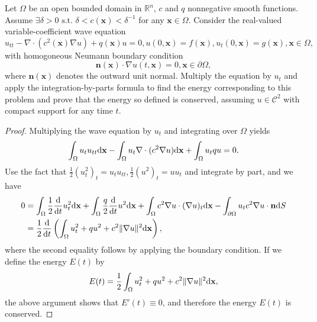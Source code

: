 \begin{pro}
  Let $\Omega$ be an open bounded domain in $\mathbb{R}^n$,
  $c$ and $q$ nonnegative smooth functions.
  Assume
  $\exists\delta>0 \text{ s.t. }\delta<c(\mathbf{x})<\delta^{-1}$
  for any $\mathbf{x}\in\Omega$.
  Consider the real-valued variable-coefficient wave equation
  \begin{equation}
    \label{eq:1}
    u_{tt}-\nabla\cdot(c^2(\mathbf{x})\nabla u) + q(\mathbf{x})u = 0,
    u(0,\mathbf{x})=f(\mathbf{x}),
    u_t(0,\mathbf{x}) = g(\mathbf{x}),
    \mathbf{x}\in\Omega,
  \end{equation}
  with homogoneous Neumann boundary condition
  \begin{displaymath}
    \mathbf{n}(\mathbf{x})\cdot\nabla u(t,\mathbf{x}) = 0, \mathbf{x}\in\partial\Omega,
  \end{displaymath}
  where $\mathbf{n}(\mathbf{x})$ denotes the outward unit normal.
  Multiply the equation by $u_t$ and apply the integration-by-parts formula
  to find the energy corresponding to this problem and prove that
  the energy so defined is conserved,
  assuming $u\in\mathcal{C}^2$ with compact support for any time $t$.
\end{pro}
\begin{proof}
  Multiplying the wave equation by $u_t$ and integrating over $\Omega$ yields
  \begin{displaymath}
    \int_{\Omega}u_tu_{tt}\mathrm{d}\mathbf{x}
    - \int_{\Omega}u_t\nabla\cdot(c^2\nabla u)\mathrm{d}\mathbf{x}
    + \int_{\Omega}u_tqu = 0.
  \end{displaymath}
  Use the fact that $\frac{1}{2}(u_t^2)_t = u_tu_{tt},
  \frac{1}{2}(u^2)_t = uu_t$ and integrate by part,
  and we have
  \begin{align*}
    0 &= \int_{\Omega}\frac{1}{2}\frac{\mathrm{d}}{\mathrm{d} t} u_t^2\mathrm{d}\mathbf{x}
    + \int_{\Omega}\frac{q}{2}\frac{\mathrm{d}}{\mathrm{d} t}u^2\mathrm{d}\mathbf{x}
    + \int_{\Omega}c^2\nabla u\cdot(\nabla u)_t\mathrm{d}\mathbf{x} -
        \int_{\partial\Omega}u_t c^2\nabla u\cdot\mathbf{n}\mathrm{d} S \\
      &=\frac{1}{2}\frac{\mathrm{d}}{\mathrm{d} t}\left(
        \int_{\Omega}u_t^2 + qu^2 +c^2\|\nabla u\|^2\mathrm{d}\mathbf{x}\right),
  \end{align*}
  where the second equality follows by applying the boundary condition.
  If we define the energy $E(t)$ by
  \begin{displaymath}
    E(t) = \frac{1}{2}\int_{\Omega}u_t^2+qu^2+c^2\|\nabla u\|^2\mathrm{d} \mathbf{x},
  \end{displaymath}
  the above argument shows that $E'(t)\equiv 0$,
  and therefore the energy $E(t)$ is conserved.
\end{proof}
